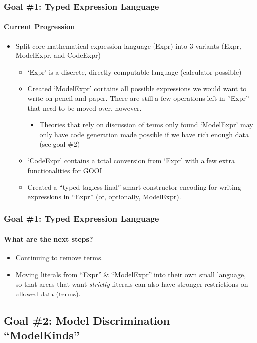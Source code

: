 \documentclass{beamer}
\begin{document}
\begin{frame}
    \frametitle{Goal \#1: Typed Expression Language}
    \framesubtitle{Current Progression}
    
    \begin{itemize}
        \item<2-> Split core mathematical expression language (Expr) into 3 variants (Expr, ModelExpr, and CodeExpr)
            \begin{itemize}
                \item<3-> `Expr' is a discrete, directly computable language (calculator possible)
                \item<4-> Created `ModelExpr' contains all possible expressions we would want to write on pencil-and-paper. There are still a few operations left in ``Expr'' that need to be moved over, however.
                    \begin{itemize}
                        \item<5-> Theories that rely on discussion of terms only found `ModelExpr' may only have code generation made possible if we have rich enough data (see goal \#2)
                    \end{itemize}
                \item<6-> `CodeExpr' contains a total conversion from `Expr' with a few extra functionalities for GOOL
                \item<7-> Created a ``typed tagless final'' smart constructor encoding for writing expressions in ``Expr'' (or, optionally, ModelExpr).
            \end{itemize}
    \end{itemize}
\end{frame}

\begin{frame}
    \frametitle{Goal \#1: Typed Expression Language}
    \framesubtitle{What are the next steps?}
    
    \begin{itemize}
        \item<2-> Continuing to remove terms.
        \item<3-> Moving literals from ``Expr'' \& ``ModelExpr'' into their own small language, so that areas that want \emph{strictly} literals can also have stronger restrictions on allowed data (terms).
    \end{itemize}
\end{frame}

\subsection{Goal \#2: Model Discrimination -- ``ModelKinds''}
\end{document}
